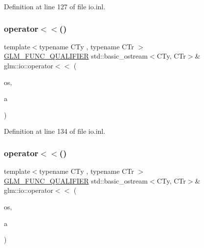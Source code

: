 Definition at line 127 of file io.\+inl.

\mbox{\label{namespaceglm_1_1io_a7c5774d5b7b03ff810042e141d893082}} 
\subsubsection{\texorpdfstring{operator$<$$<$()}{operator<<()}\hspace{0.1cm}{\footnotesize\ttfamily [3/8]}}
{\footnotesize\ttfamily template$<$typename C\+Ty , typename C\+Tr $>$ \\
\mbox{\hyperlink{setup_8hpp_a33fdea6f91c5f834105f7415e2a64407}{G\+L\+M\+\_\+\+F\+U\+N\+C\+\_\+\+Q\+U\+A\+L\+I\+F\+I\+ER}} std\+::basic\+\_\+ostream$<$C\+Ty, C\+Tr$>$\& glm\+::io\+::operator$<$$<$ (\begin{DoxyParamCaption}\item[{std\+::basic\+\_\+ostream$<$ C\+Ty, C\+Tr $>$ \&}]{os,  }\item[{\mbox{\hyperlink{structglm_1_1io_1_1delimeter}{delimeter}}$<$ C\+Ty $>$ const \&}]{a }\end{DoxyParamCaption})}



Definition at line 134 of file io.\+inl.

\mbox{\label{namespaceglm_1_1io_a4dab7c825ecbd918643ed9fc9ef4ecb6}} 
\subsubsection{\texorpdfstring{operator$<$$<$()}{operator<<()}\hspace{0.1cm}{\footnotesize\ttfamily [4/8]}}
{\footnotesize\ttfamily template$<$typename C\+Ty , typename C\+Tr $>$ \\
\mbox{\hyperlink{setup_8hpp_a33fdea6f91c5f834105f7415e2a64407}{G\+L\+M\+\_\+\+F\+U\+N\+C\+\_\+\+Q\+U\+A\+L\+I\+F\+I\+ER}} std\+::basic\+\_\+ostream$<$C\+Ty, C\+Tr$>$\& glm\+::io\+::operator$<$$<$ (\begin{DoxyParamCaption}\item[{std\+::basic\+\_\+ostream$<$ C\+Ty, C\+Tr $>$ \&}]{os,  }\item[{\mbox{\hyperlink{structglm_1_1io_1_1order}{order}} const \&}]{a }\end{DoxyParamCaption})}



